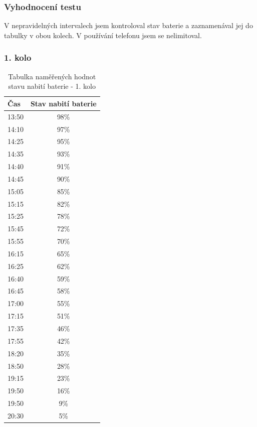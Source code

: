 \newpage

\subsubsection{Vyhodnocení testu}
V nepravidelných intervalech jsem kontroloval stav baterie a zaznamenával jej do tabulky v obou kolech. V používání telefonu jsem se nelimitoval.

\subsubsection*{1. kolo}

\begin{table}[h]
	\begin{center}
		\begin{tabular}{|l|c|}
			\hline
				{\bf Čas} & {\bf Stav nabití baterie}\\
			\hline \hline
				13:50 & 98\%\\
				\hline
				14:10 & 97\%\\
				\hline
				14:25 & 95\%\\
				\hline
				14:35 & 93\%\\
				\hline
				14:40 & 91\%\\
				\hline
				14:45 & 90\%\\
				\hline
				15:05 & 85\%\\
				\hline
				15:15 & 82\%\\
				\hline
				15:25 & 78\%\\
				\hline
				15:45 & 72\%\\
				\hline
				15:55 & 70\%\\
				\hline
				16:15 & 65\%\\
				\hline
				16:25 & 62\%\\
				\hline
				16:40 & 59\%\\
				\hline
				16:45 & 58\%\\
				\hline
				17:00 & 55\%\\
				\hline
				17:15 & 51\%\\
				\hline
				17:35 & 46\%\\
				\hline
				17:55 & 42\%\\
				\hline
				18:20 & 35\%\\
				\hline
				18:50 & 28\%\\
				\hline
				19:15 & 23\%\\
				\hline
				19:50 & 16\%\\
				\hline
				19:50 & 9\%\\
				\hline
				20:30 & 5\%\\
				\hline
		\end{tabular}
	\end{center}
	\caption{Tabulka naměřených hodnot stavu nabití baterie - 1. kolo}
	\label{tab.30s}
\end{table}

